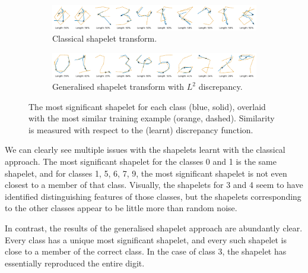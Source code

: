 \documentclass{article}
\theoremstyle{plain}
\theoremstyle{definition}
\begin{document}
\begin{figure}[t]
    \begin{subfigure}[b]{\linewidth}
        \centering
        \includegraphics[width=\linewidth]{images/old_pendigits.png}
        \caption{Classical shapelet transform.}
        \label{fig:old_shapelets}
    \end{subfigure}
    \begin{subfigure}[b]{\linewidth}
        \centering
        \includegraphics[width=\linewidth]{images/new_pendigits.png}
        \caption{Generalised shapelet transform with $L^2$ discrepancy.}
        \label{fig:new_shapelets}
    \end{subfigure}
    \caption{The most significant shapelet for each class (blue, solid), overlaid with the most similar training example (orange, dashed). Similarity is measured with respect to the (learnt) discrepancy function.}
    \label{fig:pendigits}
\end{figure}

We can clearly see multiple issues with the shapelets learnt with the classical approach. The most significant shapelet for the classes 0 and 1 is the same shapelet, and for classes 1, 5, 6, 7, 9, the most significant shapelet is not even closest to a member of that class. Visually, the shapelets for 3 and 4 seem to have identified distinguishing features of those classes, but the shapelets corresponding to the other classes appear to be little more than random noise.

In contrast, the results of the generalised shapelet approach are abundantly clear. Every class has a unique most significant shapelet, and every such shapelet is close to a member of the correct class. In the case of class 3, the shapelet has essentially reproduced the entire digit.

\end{document}
